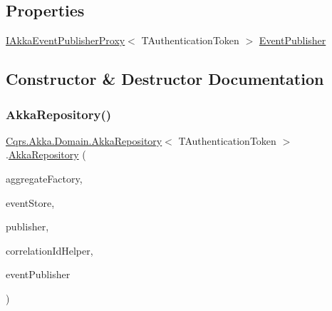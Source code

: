 \subsection*{Properties}
\begin{DoxyCompactItemize}
\item 
\hyperlink{interfaceCqrs_1_1Akka_1_1Events_1_1IAkkaEventPublisherProxy}{I\+Akka\+Event\+Publisher\+Proxy}$<$ T\+Authentication\+Token $>$ \hyperlink{classCqrs_1_1Akka_1_1Domain_1_1AkkaRepository_a52d17021123b6f56b213312351a83d55_a52d17021123b6f56b213312351a83d55}{Event\+Publisher}
\end{DoxyCompactItemize}


\subsection{Constructor \& Destructor Documentation}
\mbox{\label{classCqrs_1_1Akka_1_1Domain_1_1AkkaRepository_a2279bbdecbc33f50b20159aaec0805bf_a2279bbdecbc33f50b20159aaec0805bf}} 
\subsubsection{\texorpdfstring{Akka\+Repository()}{AkkaRepository()}}
{\footnotesize\ttfamily \hyperlink{classCqrs_1_1Akka_1_1Domain_1_1AkkaRepository}{Cqrs.\+Akka.\+Domain.\+Akka\+Repository}$<$ T\+Authentication\+Token $>$.\hyperlink{classCqrs_1_1Akka_1_1Domain_1_1AkkaRepository}{Akka\+Repository} (\begin{DoxyParamCaption}\item[{\hyperlink{interfaceCqrs_1_1Domain_1_1Factories_1_1IAggregateFactory}{I\+Aggregate\+Factory}}]{aggregate\+Factory,  }\item[{\hyperlink{interfaceCqrs_1_1Events_1_1IEventStore}{I\+Event\+Store}$<$ T\+Authentication\+Token $>$}]{event\+Store,  }\item[{\hyperlink{interfaceCqrs_1_1Events_1_1IEventPublisher}{I\+Event\+Publisher}$<$ T\+Authentication\+Token $>$}]{publisher,  }\item[{I\+Correlation\+Id\+Helper}]{correlation\+Id\+Helper,  }\item[{\hyperlink{interfaceCqrs_1_1Akka_1_1Events_1_1IAkkaEventPublisherProxy}{I\+Akka\+Event\+Publisher\+Proxy}$<$ T\+Authentication\+Token $>$}]{event\+Publisher }\end{DoxyParamCaption})}



